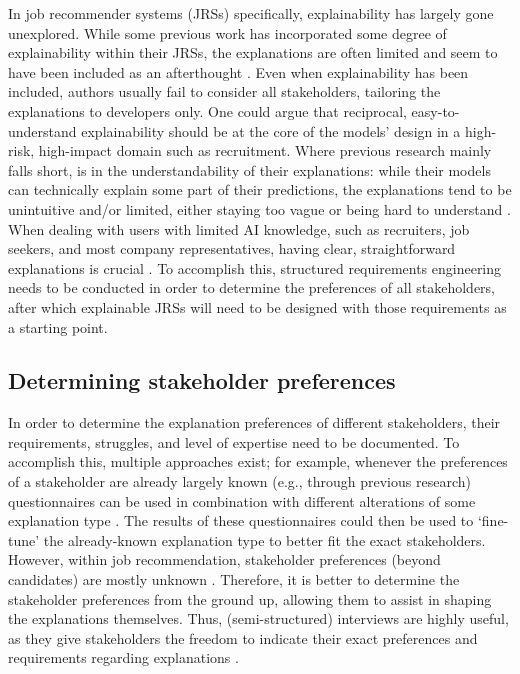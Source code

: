 In job recommender systems (JRSs) specifically, explainability has largely gone unexplored. While some previous work has incorporated some degree of explainability within their JRSs, the explanations are often limited and seem to have been included as an afterthought \cite{le2019towards,Upadhyay2021,yildirim2021bideepfm}. Even when explainability has been included, authors usually fail to consider all stakeholders, tailoring the explanations to developers only. One could argue that reciprocal, easy-to-understand explainability should be at the core of the models' design in a high-risk, high-impact domain such as recruitment. Where previous research mainly falls short, is in the understandability of their explanations: while their models can technically explain some part of their predictions, the explanations tend to be unintuitive and/or limited, either staying too vague \cite{le2019towards,Upadhyay2021} or being hard to understand \cite{yildirim2021bideepfm}. When dealing with users with limited AI knowledge, such as recruiters, job seekers, and most company representatives, having clear, straightforward explanations is crucial \cite{schellingerhout2022explainable,szymanski2021visual}. To accomplish this, structured requirements engineering needs to be conducted in order to determine the preferences of all stakeholders, after which explainable JRSs will need to be designed with those requirements as a starting point. 

\subsection{Determining stakeholder preferences}
In order to determine the explanation preferences of different stakeholders, their requirements, struggles, and level of expertise need to be documented. To accomplish this, multiple approaches exist; for example, whenever the preferences of a stakeholder are already largely known (e.g., through previous research) questionnaires can be used in combination with different alterations of some explanation type \cite{szymanski2021visual}. The results of these questionnaires could then be used to `fine-tune' the already-known explanation type to better fit the exact stakeholders. However, within job recommendation, stakeholder preferences (beyond candidates) are mostly unknown \cite{de2021job}. Therefore, it is better to determine the stakeholder preferences from the ground up, allowing them to assist in shaping the explanations themselves. Thus, (semi-structured) interviews are highly useful, as they give stakeholders the freedom to indicate their exact preferences and requirements regarding explanations \cite{longhurst2003semi}. 


